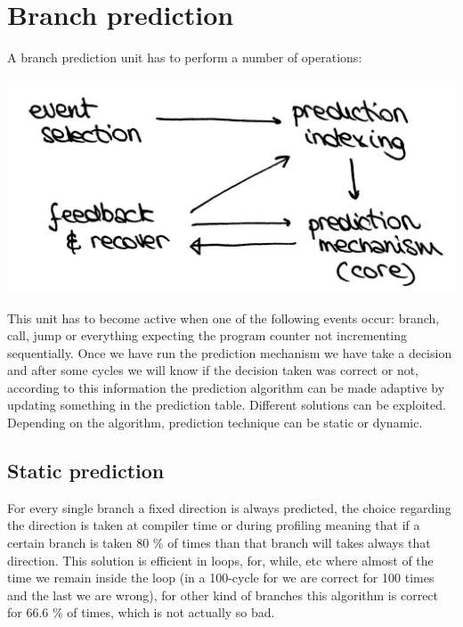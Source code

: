 \section{Branch prediction}
A branch prediction unit has to perform a number of operations:
\begin{center}
  \includegraphics[width=0.55\linewidth]{img/img3/12}
\end{center}
This unit has to become active when one of the following events occur: branch,
call, jump or everything expecting the program counter not incrementing
sequentially.
Once we have run the prediction mechanism we have take a decision and after
some cycles we will know if the decision taken was correct or not, according to
this information the prediction algorithm can be made adaptive by updating
something in the prediction table. Different solutions can be exploited.
Depending on the algorithm, prediction technique can be static or dynamic.
\subsection{Static prediction}
For every single branch a fixed direction is always predicted, the choice
regarding the direction is taken at compiler time or during profiling meaning
that if a certain branch is taken 80 \% of times than that branch will takes
always that direction. This solution is efficient in loops, for, while, etc
where almost of the time we remain inside the loop (in a 100-cycle for we are
correct for 100 times and the last we are wrong), for other kind of branches
this algorithm is correct for 66.6 \% of times, which is not actually so bad.
